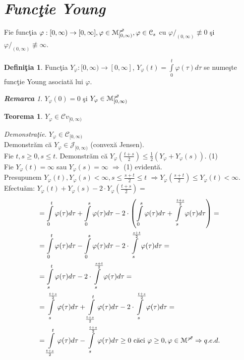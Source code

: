\documentclass[ a4paper, 12pt]{report}
\newtheorem{theorem}{\bf Teorema}[section]
\theoremstyle{definition}
\newtheorem{definition}{\bf Defini\c tia}[section]
\theoremstyle{remark}
\newtheorem{remarc}{\bf Remarca}[section]
\numberwithin{equation}{section}
\begin{document}
\section{\textit{Func\c tie Young}}
Fie func\c tia $\varphi : [0,\infty) \rightarrow [0,\infty], \varphi \in \mathcal{M}_{[0,\infty)}^{\mc}, \varphi \in \mathcal{C}_s $ cu $\varphi/_{(0,\infty)} \not\equiv 0$ \c si $\varphi/_ {(0,\infty)}\not\equiv \infty$.
\begin{definition}
Func\c tia $Y_\varphi : [0,\infty) \rightarrow [0,\infty]$, $Y_\varphi(t) = \int\limits_{0}^{t}\varphi(\tau) d\tau$ se nume\c ste func\c tie Young asociat\u a lui $\varphi$.
\end{definition}
\begin{remarc}
$Y_\varphi (0) = 0$ \c si $Y_\varphi \in \mathcal{M}_{[0,\infty)}^{\mc}$
\end{remarc}
\begin{theorem}
$Y_\varphi \in \mathcal{C}v_{[0,\infty)}$
\end{theorem}
\textit{Demonstra\c tie.}
$Y_\varphi \in \mathcal{C}_{[0,\infty)}$
\\Demonstr\u am c\u a $Y_\varphi \in \mathcal{J}_{[0,\infty)}$ (convex\u a Jensen).\\
Fie $t,s\geq 0, s\leq t$. Demonstr\u am c\u a
$Y_\varphi(\frac{t+s}{2})\leq \frac{1}{2}(Y_\varphi + Y_\varphi (s)).$ \hspace{20mm} (1) \\
Fie $Y_\varphi (t) = \infty$ sau $Y_\varphi (s) = \infty$ $\Rightarrow$ (1) evident\u a.\\
Presupunem $Y_\varphi (t),Y_\varphi (s) < \infty,  s\leq\frac{s+t}{2}\leq t $
$\Rightarrow Y_\varphi (\frac{s+t}{2}) \leq Y_\varphi (t)<\infty.$ 
Efectu\u am:
$Y_\varphi (t) + Y_\varphi (s) - 2 \cdot Y_\varphi (\frac{t+s}{2})=$
\begin{align*}
&=\int\limits_{0}^{t} \varphi(\tau)d\tau + \int\limits_{0}^{s} \varphi(\tau)d\tau - 2 \cdot \left(\int\limits_{0}^{s} \varphi(\tau)d\tau + \int\limits_{s}^{\frac{t+s}{2}} \varphi(\tau)d\tau\right)=\\
&=\int\limits_{0}^{t} \varphi(\tau)d\tau - \int\limits_{0}^{s} \varphi(\tau)d\tau - 2 \cdot \int\limits_{s}^{\frac{s+t}{2}} \varphi(\tau)d\tau =\\
&=\int\limits_{s}^{t} \varphi(\tau)d\tau - 2 \cdot\int\limits_{s}^{\frac{s+t}{2}} \varphi(\tau)d\tau=\\
&=\int\limits_{s}^{\frac{t+s}{2}} \varphi(\tau)d\tau + \int\limits_{\frac{t+s}{2}}^{t} \varphi(\tau)d\tau - 2 \cdot \int\limits_{s}^{\frac{t+s}{2}}\varphi(\tau)d\tau=\\
&=\int\limits_{\frac{t+s}{2}}^{t} \varphi(\tau)d\tau - \int\limits_{s}^{\frac{t+s}{2}} \varphi(\tau)d\tau \geq 0 \ \mbox{c\u aci} \  \varphi \geq 0, \varphi \in \mathcal{M}^{\mc}\Rightarrow q.e.d. 
\end{align*}
\end{document}
